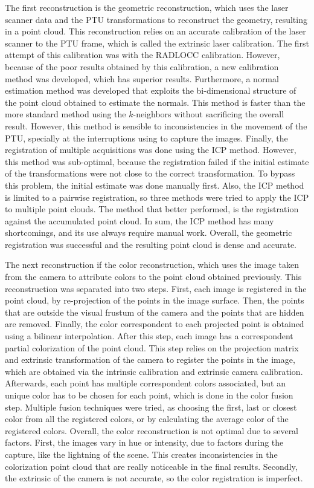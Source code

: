 The first reconstruction is the geometric reconstruction, which uses the laser scanner data and the PTU transformations to reconstruct the geometry, resulting in a point cloud. This reconstruction relies on an accurate calibration of the laser scanner to the PTU frame, which is called the extrinsic laser calibration. The first attempt of this calibration was with the RADLOCC calibration. However, because of the poor results obtained by this calibration, a new calibration method was developed, which has superior results. Furthermore, a normal estimation method was developed that exploits the bi-dimensional structure of the point cloud obtained to estimate the normals. This method is faster than the more standard method using the $k$-neighbors without sacrificing the overall result. However, this method is sensible to inconsistencies in the movement of the PTU, specially at the interruptions using to capture the images. Finally, the registration of multiple acquisitions was done using the ICP method. However, this method was sub-optimal, because the registration failed if the initial estimate of the transformations were not close to the correct transformation. To bypass this problem, the initial estimate was done manually first. Also, the ICP method is limited to a pairwise registration, so three methods were tried to apply the ICP to multiple point clouds. The method that better performed, is the registration against the accumulated point cloud. In sum, the ICP method has many shortcomings, and its use always require manual work. Overall, the geometric registration was successful and the resulting point cloud is dense and accurate. 

The next reconstruction if the color reconstruction, which uses the image taken from the camera to attribute colors to the point cloud obtained previously. This reconstruction was separated into two steps. First, each image is registered in the point cloud, by re-projection of the points in the image surface. Then, the points that are outside the visual frustum of the camera and the points that are hidden are removed. Finally, the color correspondent to each projected point is obtained using a bilinear interpolation. After this step, each image has a correspondent partial colorization of the point cloud. This step relies on the projection matrix and extrinsic transformation of the camera to register the points in the image, which are obtained via the intrinsic calibration and extrinsic camera calibration. Afterwards, each point has multiple correspondent colors associated, but an unique color has to be chosen for each point, which is done in the color fusion step. Multiple fusion techniques were tried, as choosing the first, last or closest color from all the registered colors, or by calculating the average color of the registered colors. Overall, the color reconstruction is not optimal due to several factors. First, the images vary in hue or intensity, due to factors during the capture, like the lightning of the scene. This creates inconsistencies in the colorization point cloud that are really noticeable in the final results. Secondly, the extrinsic of the camera is not accurate, so the color registration is imperfect. 

